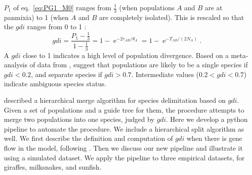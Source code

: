 \documentclass{article1}
\DeclareMathOperator{\e}{\mathrm{e}}
\begin{document}
$P_1$ of eq.~\ref{eq:PG1_M0} ranges from $\frac{1}{3}$ (when populations $A$ and $B$ are
at panmixia) to 1 (when $A$ and $B$ are completely isolated).  This is rescaled so that
the $gdi$ ranges from 0 to 1 \citet{Jackson2017}:
\begin{equation} \label{eq:gdi}
   gdi = \frac{P_1 - \frac{1}{3}}{1-\frac{1}{3}} = 1 - \e^{-2\tau_{AB} / \theta_A} = 1 - \e^{-T_{AB} / (2N_A)}.
\end{equation} 
A $gdi$ close to 1 indicates a high level of population divergence.  Based on a
meta-analysis of data from \citet{Pinho2010}, \citet{Jackson2017} suggest that
populations are likely to be a single species if $gdi < 0.2$, and separate species if
$gdi > 0.7$.  Intermediate values ($0.2 < gdi < 0.7$) indicate ambiguous species status.

\citet{Leache2019} described a hierarchical merge algorithm for species delimitation based
on $gdi$.  Given a set of populations and a guide tree for them, the procedure
attempts to merge two populations into one species, judged by $gdi$. Here we
develop a python pipeline to automate the procedure.  We include a hierarchical split
algorithm as well.  We first describe the definition and computation of $gdi$ when
there is gene flow in the model, following \citet{Leache2019}.  Then we discuss our new
pipeline and illustrate it using a simulated dataset.  We apply the pipeline to three
empirical datasets, for giraffes, milksnakes, and sunfish.
\end{document}
